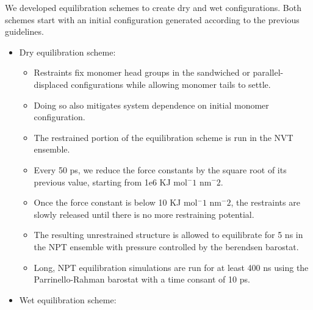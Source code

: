 \documentclass{article}
\begin{document}
  We developed equilibration schemes to create dry and wet configurations. Both schemes 
  start with an initial configuration generated according to the previous guidelines.
  \begin{itemize}
      \item Dry equilibration scheme:
      \begin{itemize}
          \item Restraints fix monomer head groups in the sandwiched or parallel-displaced
          configurations while allowing monomer tails to settle.
          \item Doing so also mitigates system dependence on initial monomer configuration.
          \item The restrained portion of the equilibration scheme is run in the NVT ensemble.
          \item Every 50 ps, we reduce the force constants by the square root of its
          previous value, starting from 1e6 KJ mol$^-1$ nm$^-2$.
          \item Once the force constant is below 10 KJ mol$^-1$ nm$^-2$, the restraints are
          slowly released until there is no more restraining potential.
          \item The resulting unrestrained structure is allowed to equilibrate for 5 ns 
	  in the NPT ensemble with pressure controlled by the berendsen barostat.
	  \item Long, NPT equilibration simulations are run for at least 400 ns using the 
          Parrinello-Rahman barostat with a time consant of 10 ps.
      \end{itemize}
      \item Wet equilibration scheme: 
      \begin{itemize}

\end{itemize}
\end{itemize}
\end{document}
